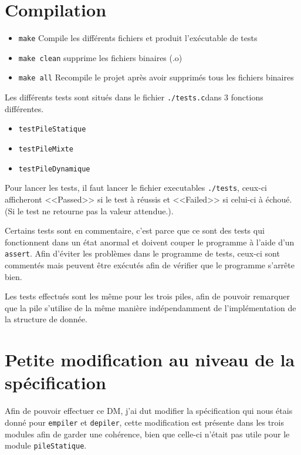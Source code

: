 \documentclass[a4paper, 11pt]{article}
\begin{document}
	\maketitle
	\section{Compilation}
	\begin{itemize}
		\item \texttt{make} Compile les différents fichiers et produit l'exécutable de tests
		\item \texttt{make clean} supprime les fichiers binaires (.o)
		\item \texttt{make all} Recompile le projet après avoir supprimés tous les fichiers binaires 
	\end{itemize}

	Les différents tests sont situés dans le fichier \texttt{./tests.c}dans 3 fonctions différentes. 
	\begin{itemize}
		\item \texttt{testPileStatique}
		\item \texttt{testPileMixte}
		\item \texttt{testPileDynamique}
	\end{itemize}
	Pour lancer les tests, il faut lancer le fichier executables \texttt{./tests}, ceux-ci afficheront <<Passed>> 
	si le test à réussis et <<Failed>> si celui-ci à échoué. (Si le test ne retourne pas la valeur attendue.). 

	Certains tests sont en commentaire, c'est parce que ce sont des tests qui fonctionnent dans un état anormal et doivent couper le programme à l'aide d'un
	\texttt{assert}. Afin d'éviter les problèmes dans le programme de tests, ceux-ci sont commentés mais peuvent être exécutés afin de vérifier que le programme s'arrête
	bien.

	Les tests effectués sont les même pour les trois piles, afin de pouvoir remarquer que la pile s'utilise de la même manière indépendamment de l'implémentation
	de la structure de donnée.

	\section{Petite modification au niveau de la spécification}
	Afin de pouvoir effectuer ce DM, j'ai dut modifier la spécification qui nous étais donné pour \texttt{empiler} et \texttt{depiler}, cette modification est présente dans les
	trois modules afin de garder une cohérence, bien que celle-ci n'était pas utile pour le module \texttt{pileStatique}. 
\end{document}
